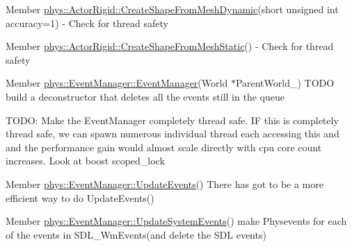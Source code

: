 \label{dd/da0/todo__todo000001}
\hypertarget{dd/da0/todo__todo000001}{}
 
\begin{DoxyDescription}
\item[Member \hyperlink{classphys_1_1ActorRigid_aab4a408ce0724be6adf4c9f51f55f8a1}{phys::ActorRigid::CreateShapeFromMeshDynamic}(short unsigned int accuracy=1) ]-\/ Check for thread safety 
\end{DoxyDescription}

\label{dd/da0/todo__todo000002}
\hypertarget{dd/da0/todo__todo000002}{}
 
\begin{DoxyDescription}
\item[Member \hyperlink{classphys_1_1ActorRigid_a84554dcaaf2475ba0ec7dcb9235050ac}{phys::ActorRigid::CreateShapeFromMeshStatic}() ]-\/ Check for thread safety 
\end{DoxyDescription}

\label{dd/da0/todo__todo000007}
\hypertarget{dd/da0/todo__todo000007}{}
 
\begin{DoxyDescription}
\item[Member \hyperlink{classphys_1_1EventManager_a148f8c559642d3d50206169b3d0406be}{phys::EventManager::EventManager}(World $\ast$ParentWorld\_\-) ]TODO build a deconstructor that deletes all the events still in the queue 

TODO: Make the EventManager completely thread safe. IF this is completely thread safe, we can spawn numerous individual thread each accessing this and and the performance gain would almost scale directly with cpu core count increases. Look at boost scoped\_\-lock 
\end{DoxyDescription}

\label{dd/da0/todo__todo000005}
\hypertarget{dd/da0/todo__todo000005}{}
 
\begin{DoxyDescription}
\item[Member \hyperlink{classphys_1_1EventManager_a63cf23dc9fe0ced3e2c60ca61c97b166}{phys::EventManager::UpdateEvents}() ]There has got to be a more efficient way to do UpdateEvents() 
\end{DoxyDescription}

\label{dd/da0/todo__todo000006}
\hypertarget{dd/da0/todo__todo000006}{}
 
\begin{DoxyDescription}
\item[Member \hyperlink{classphys_1_1EventManager_a0cf574c55def063d66d7db46a4d3e8a5}{phys::EventManager::UpdateSystemEvents}() ]make Physevents for each of the events in SDL\_\-WmEvents(and delete the SDL events) 
\end{DoxyDescription}

